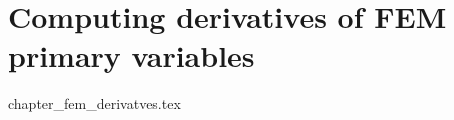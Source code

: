 \chapter{Computing derivatives of FEM primary variables} \label{fem_derivatives} 
\begin{flushright} {\tiny {\color{gray} chapter\_fem\_derivatves.tex}} \end{flushright}


